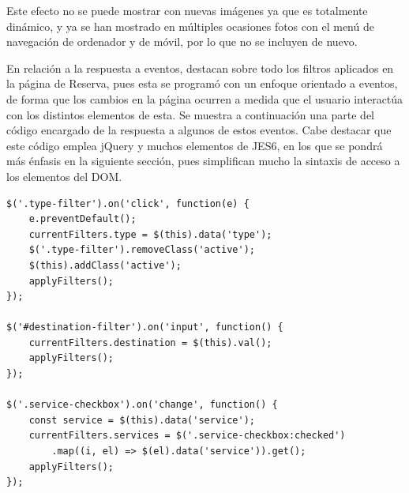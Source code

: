 \documentclass[11pt, a4paper]{book}
\begin{document}
	Este efecto no se puede mostrar con nuevas imágenes ya que es totalmente dinámico, y ya se han mostrado en múltiples ocasiones fotos con el menú de navegación de ordenador y de móvil, por lo que no se incluyen de nuevo.

    En relación a la respuesta a eventos, destacan sobre todo los filtros aplicados en la página de Reserva, pues esta se programó con un enfoque orientado a eventos, de forma que los cambios en la página ocurren a medida que el usuario interactúa con los distintos elementos de esta. Se muestra a continuación una parte del código encargado de la respuesta a algunos de estos eventos. Cabe destacar que este código emplea jQuery y muchos elementos de JES6, en los que se pondrá más énfasis en la siguiente sección, pues simplifican mucho la sintaxis de acceso a los elementos del DOM.

    \begin{lstlisting}
$('.type-filter').on('click', function(e) {
    e.preventDefault();
    currentFilters.type = $(this).data('type');
    $('.type-filter').removeClass('active');
    $(this).addClass('active');
    applyFilters();
});

$('#destination-filter').on('input', function() {
    currentFilters.destination = $(this).val();
    applyFilters();
});

$('.service-checkbox').on('change', function() {
    const service = $(this).data('service');
    currentFilters.services = $('.service-checkbox:checked')
        .map((i, el) => $(el).data('service')).get();
    applyFilters();
});
    \end{lstlisting}
\end{document}
